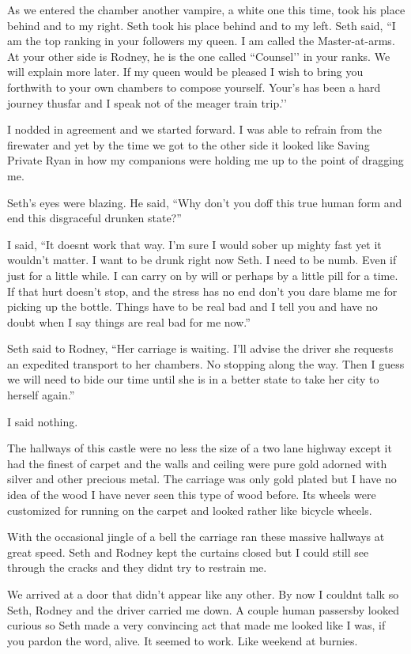 As we entered the chamber another vampire, a white one this time, took his place behind and to my right. Seth took his place behind and to my left. Seth said, ``I am the top ranking in your followers my queen. I am called the Master-at-arms. At your other side is Rodney, he is the one called “Counsel’’ in your ranks. We will explain more later. If my queen would be pleased I wish to bring you forthwith to your own chambers to compose yourself. Your’s has been a hard journey thusfar and I speak not of the meager train trip.’’

I nodded in agreement and we started forward. I was able to refrain from the firewater and yet by the time we got to the other side it looked like Saving Private Ryan in how my companions were holding me up to the point of dragging me.

Seth's eyes were blazing. He said, ``Why don't you doff this true human form and end this disgraceful drunken state?''

I said, ``It doesnt work that way. I'm sure I would sober up mighty fast yet it wouldn't matter. I want to be drunk right now Seth. I need to be numb. Even if just for a little while. I can carry on by will or perhaps by a little pill for a time. If that hurt doesn't stop, and the stress has no end don't you dare blame me for picking up the bottle. Things have to be real bad and I tell you and have no doubt when I say things are real bad for me now.''

Seth said to Rodney, ``Her carriage is waiting. I'll advise the driver she requests an expedited transport to her chambers. No stopping along the way. Then I guess we will need to bide our time until she is in a better state to take her city to herself again.''

I said nothing.

The hallways of this castle were no less the size of a two lane highway except it had the finest of carpet and the walls and ceiling were pure gold adorned with silver and other precious metal. The carriage was only gold plated but I have no idea of the wood I have never seen this type of wood before. Its wheels were customized for running on the carpet and looked rather like bicycle wheels.

With the occasional jingle of a bell the carriage
ran these massive hallways at great speed. Seth and Rodney kept the curtains closed but I could still see through the cracks and they didnt try to restrain me.

We arrived at a door that didn't appear like any other. By now I couldnt talk so Seth, Rodney and the driver carried me down. A couple human passersby looked curious so Seth made a very convincing act that made me looked like I was, if you pardon the word, alive. It seemed to work. Like weekend at burnies.

